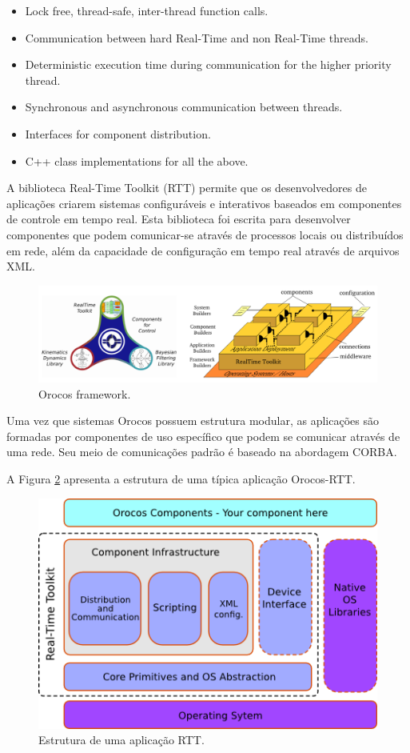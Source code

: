 \documentclass[conference]{IEEEtran}
\begin{document}
\begin{itemize}
	\item Lock free, thread-safe, inter-thread function calls.
	\item Communication between hard Real-Time and non Real-Time threads.
	\item Deterministic execution time during communication for the higher priority thread.
	\item Synchronous and asynchronous communication between threads.
	\item Interfaces for component distribution.
	\item C++ class implementations for all the above.
\end{itemize}

A biblioteca Real-Time Toolkit (RTT) permite que os desenvolvedores de aplicações criarem sistemas configuráveis e interativos baseados em componentes de controle em tempo real. Esta biblioteca foi escrita para desenvolver componentes que podem comunicar-se através de processos locais ou distribuídos em rede, além da capacidade de configuração em tempo real através de arquivos XML.

\begin{figure}[h]
	\centering
	\includegraphics[scale=0.22]{files/orocos_stack.png}
	\caption{Orocos framework.  \cite{Orocos_manual}}
	\label{fig:orocos_stack}
\end{figure}

Uma vez que sistemas Orocos possuem estrutura modular, as aplicações são formadas por componentes de uso específico que podem se comunicar através de uma rede. Seu meio de comunicações padrão é baseado na abordagem CORBA.

A Figura \ref{fig:orocos_app_stack} apresenta a estrutura de uma típica aplicação Orocos-RTT.

\begin{figure}[h]
	\centering
	\includegraphics[scale=0.33]{files/ApplicationStack2.png}
	\caption{Estrutura de uma aplicação RTT.}
	\label{fig:orocos_app_stack}
\end{figure}
\end{document}
